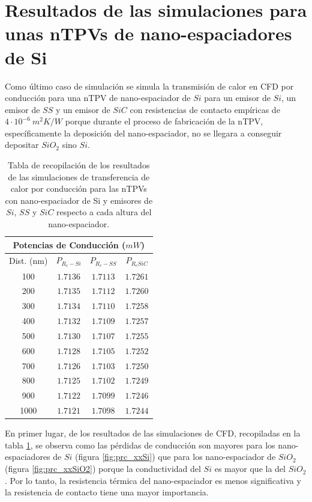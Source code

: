 \section{Resultados de las simulaciones para unas nTPVs de nano-espaciadores de Si}\label{sec:res_XxSiGe}
\graphicspath{ {./figuras/Resultados/DiffMatEsp} }
Como último caso de simulación se simula la transmisión de calor en CFD por conducción para una nTPV de nano-espaciador de $Si$ para un emisor de $Si$, un emisor de $SS$ y un emisor de $SiC$ con resistencias de contacto empíricas de $4\cdot 10^{-6} \ m^2 K/W$ porque durante el proceso de fabricación de la nTPV, específicamente la deposición del nano-espaciador, no se llegara a conseguir depositar $SiO_2$ sino $Si$.
\begin{table}[H]
	\centering
		\begin{tabular}{|c||c|c|c|}
		\hline
		 \multicolumn{4}{|c|}{\textbf{Potencias de Conducción ($mW$)}}\\	\hline
		Dist. (nm)&$P_{R_c-Si}$&$P_{R_c-SS}$&$P_{R_cSiC}$\\ \hline \hline 
		100&$1.7136$&$1.7113$&$1.7261$\\ \hline 
		200&$1.7135$&$1.7112$&$1.7260$\\ \hline 
		300&$1.7134$&$1.7110$&$1.7258$\\ \hline 
		400&$1.7132$&$1.7109$&$1.7257$\\ \hline 
		500&$1.7130$&$1.7107$&$1.7255$\\ \hline 
		600&$1.7128$&$1.7105$&$1.7252$\\ \hline 
		700&$1.7126$&$1.7103$&$1.7250$\\ \hline 
		800&$1.7125$&$1.7102$&$1.7249$\\ \hline 
		900&$1.7122$&$1.7099$&$1.7246$\\ \hline 
		1000&$1.7121$&$1.7098$&$1.7244$\\ \hline
		\end{tabular}
	\caption{Tabla de recopilación de los resultados de las simulaciones de transferencia de calor por conducción para las nTPVs con nano-espaciador de Si y emisores de $Si$, $SS$ y $SiC$ respecto a cada altura del nano-espaciador.}
	\label{tab:nanoEspaciadorDeSi}
\end{table}
En primer lugar, de los resultados de las simulaciones de CFD, recopiladas en la tabla \ref{tab:nanoEspaciadorDeSi}, se observa como las pérdidas de conducción son mayores para los nano-espaciadores de $Si$ (figura \ref{fig:prc_xxSi}) que para los nano-espaciador de $SiO_2$ (figura \ref{fig:prc_xxSiO2}) porque la conductividad del $Si$ es mayor que la del $SiO_2$. Por lo tanto, la resistencia térmica del nano-espaciador es menos significativa y la resistencia de contacto tiene una mayor importancia.
